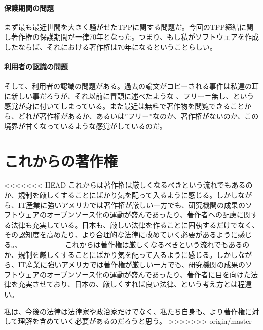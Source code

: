 \documentclass[a4j]{jsarticle}
\begin{document}
\subsection*{保護期間の問題}
まず最も最近世間を大きく騒がせたTPPに関する問題だ。今回のTPP締結に関し著作権の保護期間が一律70年となった。つまり、もし私がソフトウェアを作成したならば、それにおける著作権は70年になるということらしい。\cite{def_re}
\subsection*{利用者の認識の問題}
そして、利用者の認識の問題がある。過去の論文がコピーされる事件は私達の耳に新しい事だろうが、それ以前に冒頭に述べたような 、フリー＝無し、という感覚が身に付いてしまっている。また最近は無料で著作物を閲覧できることから、どれが著作権があるか、あるいは”フリー”なのか、著作権がないのか、この境界が甘くなっているような感覚がしているのだ。
\part{これからの著作権}
<<<<<<< HEAD
これからは著作権は厳しくなるべきという流れでもあるのか、規制を厳しくすることにばかり気を配って入るように感じる。しかしながら、IT産業に強いアメリカでは著作権が厳しい一方でも、研究機関の成果のソフトウェアのオープンソース化の運動が盛んであったり、著作者への配慮に関する法律も充実している。日本も、厳しい法律を作ることに固執するだけでなく、その認知度を高めたり、より合理的な法律に改めていく必要があるように感じる。\cite{def_m_o}、
=======
これからは著作権は厳しくなるべきという流れでもあるのか、規制を厳しくすることにばかり気を配って入るように感じる。しかしながら、IT産業に強いアメリカでは著作権が厳しい一方でも、研究機関の成果のソフトウェアのオープンソース化の運動が盛んであったり、著作者に目を向けた法律を充実させており、日本の、厳しくすれば良い法律、という考え方とは程遠い。\cite{def_m_o}　\par
私は、今後の法律は法律家や政治家だけでなく、私たち自身も、より著作権に対して理解を含めていく必要があるのだろうと思う。
>>>>>>> origin/master



\end{document}
